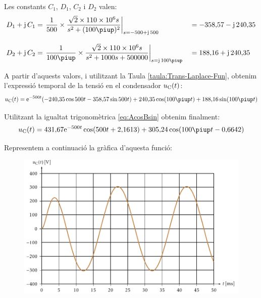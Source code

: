 \begin{exemple}
Les constants $C_1$, $D_1$,  $C_2$ i $D_2$ valen:
\begin{alignat*}{2}
    D_1 + \ju\,C_1 &= \left.\frac{1}{500}\times \frac{\sqrt{2}\times 110\times 10^6 s}
    {s^2 +(100\piup)^2}\right|_{s=-500+\ju\,500} &&=-358{,}57 -\ju\,
    240{,}35\\[2ex]
    D_2 + \ju\,C_2 &= \left.\frac{1}{100\piup}\times\frac{\sqrt{2}\times 110\times 10^6 s}
    {s^2 + 1000 s + 500000}\right|_{s=\ju\,100\piup} &&= 188{,}16 + \ju\,240{,}35
\end{alignat*}

A partir d'aquests valors, i utilitzant la Taula
\vref{taula:Trans-Laplace-Fun}, obtenim l'expressi\'{o} temporal de la
tensi\'{o} en el condensador $u_\mathrm{C}(t)$:
\[
    u\ped{C}(t) = \eu^{-500t} (-240{,}35 \cos 500 t - 358{,}57 \sin 500
    t) + 240{,}35 \cos (100\piup t) + 188{,}16 \sin( 100\piup
    t)
\]

Utilitzant la igualtat trigonom\`{e}trica \eqref{eq:AcosBsin} obtenim finalment:
\[
    u\ped{C}(t)= 431{,}67 \eu^{-500t} \cos(500 t +2{,}1613) + 305{,}24 \cos (100\piup t - 0{,}6642)
\]

\break
Representem a continuaci\'{o} la gr\`{a}fica d'aquesta
funci\'{o}:

\begin{figure}[h]
\centering
  \includegraphics{Imatges/Cap-Laplace-Exemple4-Tensio.pdf}
\end{figure}

\end{exemple}

